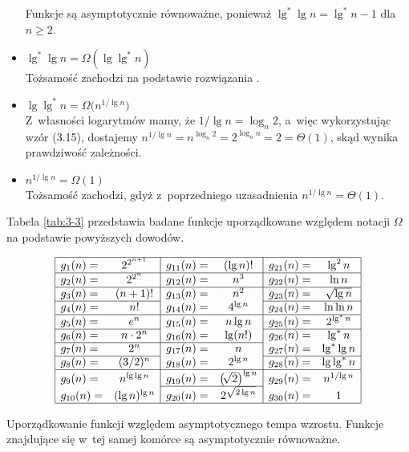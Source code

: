 \begin{itemize}
	Funkcje są asymptotycznie równoważne, ponieważ $\lg^*\lg n=\lg^*n-1$ dla $n\ge2$.
\item $\lg^*\lg n=\Omega(\lg\lg^*n)$ \\
	Tożsamość zachodzi na podstawie rozwiązania .
\item $\lg\lg^*n=\Omega\bigl(n^{1/\!\lg n}\bigr)$ \\
	Z~własności logarytmów mamy, że $1/\!\lg n=\log_n2$, a~więc wykorzystując wzór (3.15), dostajemy $n^{1/\!\lg n}=n^{\log_n2}=2^{\log_nn}=2=\Theta(1)$, skąd wynika prawdziwość zależności.
\item $n^{1/\!\lg n}=\Omega(1)$ \\
	Tożsamość zachodzi, gdyż z~poprzedniego uzasadnienia $n^{1/\!\lg n}=\Theta(1)$.
\end{itemize}

Tabela \ref{tab:3-3} przedstawia badane funkcje uporządkowane względem notacji $\Omega$ na podstawie powyższych dowodów.
\begin{table}[!ht]
	\centering
		\[
			\begin{array}{|lc|lc|lc|} \hline
				g_1(n)= & 2^{2^{n+1}} & g_{11}(n)= & (\lg n)! & g_{21}(n)= & \lg^2n \\ \hline
				g_2(n)= & 2^{2^n} & g_{12}(n)= & n^3 & g_{22}(n)= & \ln n \\ \hline
				g_3(n)= & (n+1)! & g_{13}(n)= & n^2 & g_{23}(n)= & \sqrt{\lg n} \\ \cline{1-2}\cline{5-6}
				g_4(n)= & n! & g_{14}(n)= & 4^{\lg n} & g_{24}(n)= & \ln\ln n \\ \hline
				g_5(n)= & e^n & g_{15}(n)= & n\lg n & g_{25}(n)= & 2^{\lg^*n} \\ \cline{1-2}\cline{5-6}
				g_6(n)= & n\cdot2^n & g_{16}(n)= & \lg(n!) & g_{26}(n)= & \lg^*n \\ \cline{1-4}
				g_7(n)= & 2^n & g_{17}(n)= & n & g_{27}(n)= & \lg^*\lg n \\ \cline{1-2}\cline{5-6}
				g_8(n)= & (3/2)^n & g_{18}(n)= & 2^{\lg n} & g_{28}(n)= & \lg\lg^*n \\ \hline
				g_9(n)= & n^{\lg\lg n} & g_{19}(n)= & \bigl(\!\sqrt{2}\bigr)^{\lg n} & g_{29}(n)= & n^{1/\!\lg n} \\ \cline{3-4}
				g_{10}(n)= & (\lg n)^{\lg n} & g_{20}(n)= & 2^{\sqrt{2\lg n}} & g_{30}(n)= & 1 \\ \hline
			\end{array}
		\]
	\caption{Uporządkowanie funkcji względem asymptotycznego tempa wzrostu.
Funkcje znajdujące się w~tej samej komórce są asymptotycznie równoważne.} \label{tab:3-3}
\end{table}

